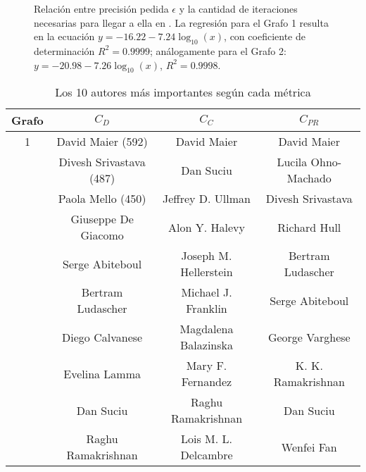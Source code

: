 \documentclass[journal]{IEEEtran}
\let\MYoriglatexcaption\caption
\renewcommand{\caption}[2][\relax]{\MYoriglatexcaption[#2]{#2}}
\begin{document}
\begin{figure}[!t]
\centering
{}
\caption{Relación entre precisión pedida \(\epsilon\) y la cantidad de iteraciones necesarias para llegar a ella en \textproc{PageRank}. La regresión para el Grafo 1 resulta en la ecuación $y = -16.22-7.24\log_{10}(x)$, con coeficiente de determinación  $R^2 = 0.9999$; análogamente para el Grafo 2: $y = -20.98-7.26\log_{10}(x)$, $R^2 = 0.9998$.}
\label{fig:itpr}
\end{figure}

\begin{table*}
	\renewcommand{\arraystretch}{1.3}
	\caption{Los 10 autores más importantes según cada métrica}
	\label{tab:erdos}
	\centering
	\begin{tabular}{c|c|c|c}
		\hline
		Grafo & \(C_D\) & \(C_C\) & \(C_{PR}\)\\
		\hline\hline
		1 & David Maier (592)& David Maier & David Maier\\
		  &	Divesh Srivastava (487)& Dan Suciu & Lucila Ohno-Machado \\
		  &	Paola Mello (450)& Jeffrey D. Ullman & Divesh Srivastava\\
		  &	Giuseppe De Giacomo & Alon Y. Halevy & Richard Hull\\
		  &	Serge Abiteboul & Joseph M. Hellerstein & Bertram Ludascher\\
		  & Bertram Ludascher & Michael J. Franklin & Serge Abiteboul\\
		  & Diego Calvanese & Magdalena Balazinska & George Varghese\\
		  & Evelina Lamma & Mary F. Fernandez & K. K. Ramakrishnan\\
		  & Dan Suciu & Raghu Ramakrishnan & Dan Suciu\\
		  &	Raghu Ramakrishnan & Lois M. L. Delcambre & Wenfei Fan\\
		\hline
	\end{tabular}
\end{table*}
\end{document}
